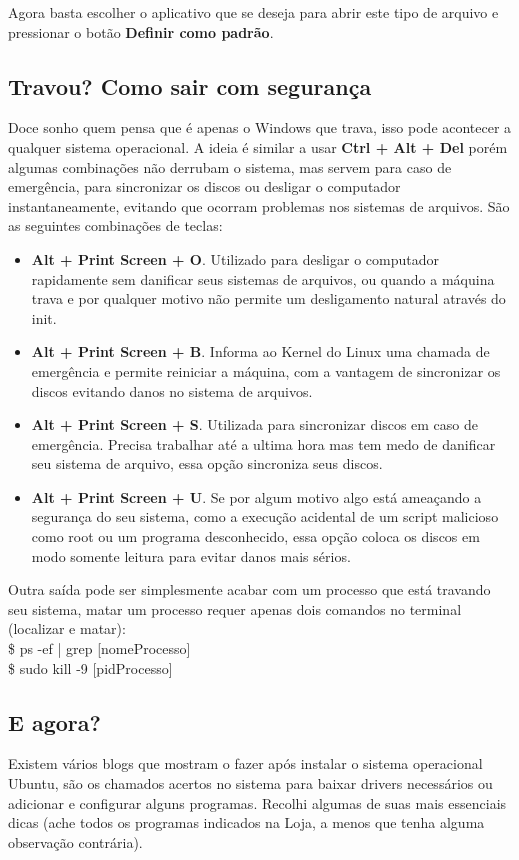 Agora basta escolher o aplicativo que se deseja para abrir este tipo de arquivo e pressionar o botão \textbf{Definir como padrão}. 

\subsection{Travou? Como sair com segurança}
Doce sonho quem pensa que é apenas o Windows que trava, isso pode acontecer a qualquer sistema operacional. A ideia é similar a usar \textbf{Ctrl + Alt + Del} porém algumas combinações não derrubam o sistema, mas servem para caso de emergência, para sincronizar os discos ou desligar o computador instantaneamente, evitando que ocorram problemas nos sistemas de arquivos. São as seguintes combinações de teclas: \vspace{-1em}
\begin{itemize}[noitemsep]
 \item \textbf{Alt + Print Screen + O}. Utilizado para desligar o computador rapidamente sem danificar seus sistemas de arquivos, ou quando a máquina trava e por qualquer motivo não permite um desligamento natural através do init. 
 \item \textbf{Alt + Print Screen + B}. Informa ao Kernel do Linux uma chamada de emergência e permite reiniciar a máquina, com a vantagem de sincronizar os discos evitando danos no sistema de arquivos.  
 \item \textbf{Alt + Print Screen + S}. Utilizada para sincronizar discos em caso de emergência. Precisa trabalhar até a ultima hora mas tem medo de danificar seu sistema de arquivo, essa opção sincroniza seus discos.
 \item \textbf{Alt + Print Screen + U}. Se por algum motivo algo está ameaçando a segurança do seu sistema, como a execução acidental de um script malicioso como root ou um programa desconhecido, essa opção coloca os discos em modo somente leitura para evitar danos mais sérios.
\end{itemize}

Outra saída pode ser simplesmente acabar com um processo que está travando seu sistema, matar um processo requer apenas dois comandos no terminal (localizar e matar): \\
{\ttfamily\$ ps -ef | grep [nomeProcesso] \\
\$ sudo kill -9 [pidProcesso]}

\subsection{E agora?}
Existem vários blogs que mostram o fazer após instalar o sistema operacional Ubuntu, são os chamados acertos no sistema para baixar drivers necessários ou adicionar e configurar alguns programas. Recolhi algumas de suas mais essenciais dicas (ache todos os programas indicados na Loja, a menos que tenha alguma observação contrária).

